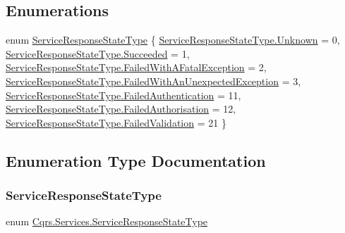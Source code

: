 \subsection*{Enumerations}
\begin{DoxyCompactItemize}
\item 
enum \hyperlink{namespaceCqrs_1_1Services_a41411b784c4fcb7eed0cef2a5b522de0}{Service\+Response\+State\+Type} \{ \newline
\hyperlink{namespaceCqrs_1_1Services_a41411b784c4fcb7eed0cef2a5b522de0a88183b946cc5f0e8c96b2e66e1c74a7e}{Service\+Response\+State\+Type.\+Unknown} = 0, 
\hyperlink{namespaceCqrs_1_1Services_a41411b784c4fcb7eed0cef2a5b522de0a66d02c2f8a582446f8dd8752366002b5}{Service\+Response\+State\+Type.\+Succeeded} = 1, 
\hyperlink{namespaceCqrs_1_1Services_a41411b784c4fcb7eed0cef2a5b522de0adf356d2a26b9021bbf29a4c477ba6534}{Service\+Response\+State\+Type.\+Failed\+With\+A\+Fatal\+Exception} = 2, 
\hyperlink{namespaceCqrs_1_1Services_a41411b784c4fcb7eed0cef2a5b522de0a485362764734183da5fc0c43da6d4648}{Service\+Response\+State\+Type.\+Failed\+With\+An\+Unexpected\+Exception} = 3, 
\newline
\hyperlink{namespaceCqrs_1_1Services_a41411b784c4fcb7eed0cef2a5b522de0a0e67fb99f2a0d54965191d09312d347a}{Service\+Response\+State\+Type.\+Failed\+Authentication} = 11, 
\hyperlink{namespaceCqrs_1_1Services_a41411b784c4fcb7eed0cef2a5b522de0ad80139b7a01b796769d7d7e9744b656c}{Service\+Response\+State\+Type.\+Failed\+Authorisation} = 12, 
\hyperlink{namespaceCqrs_1_1Services_a41411b784c4fcb7eed0cef2a5b522de0ab200ca8ee3861d3b22d05cf046935d62}{Service\+Response\+State\+Type.\+Failed\+Validation} = 21
 \}
\end{DoxyCompactItemize}


\subsection{Enumeration Type Documentation}
\mbox{\label{namespaceCqrs_1_1Services_a41411b784c4fcb7eed0cef2a5b522de0}} 
\subsubsection{\texorpdfstring{Service\+Response\+State\+Type}{ServiceResponseStateType}}
{\footnotesize\ttfamily enum \hyperlink{namespaceCqrs_1_1Services_a41411b784c4fcb7eed0cef2a5b522de0}{Cqrs.\+Services.\+Service\+Response\+State\+Type}\hspace{0.3cm}{\ttfamily [strong]}}

